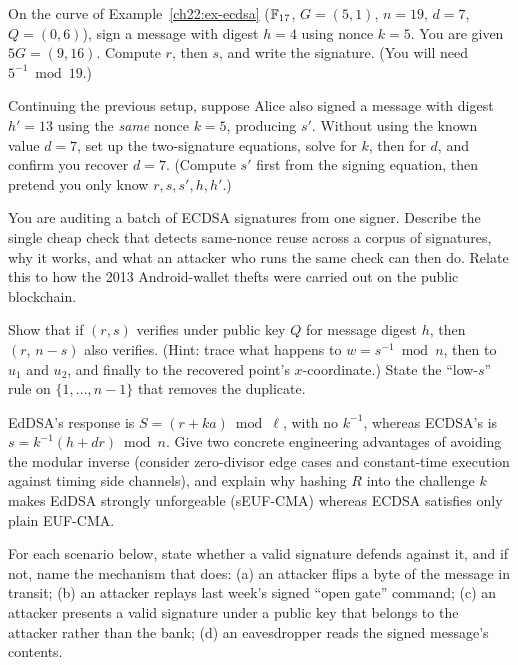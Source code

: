 \begin{exercise}
On the curve of Example~\ref{ch22:ex-ecdsa} ($\mathbb{F}_{17}$, $G=(5,1)$, $n=19$, $d=7$, $Q=(0,6)$), sign a message with digest $h = 4$ using nonce $k = 5$. You are given $5G = (9, 16)$. Compute $r$, then $s$, and write the signature. (You will need $5^{-1}\bmod 19$.)
\end{exercise}

\begin{exercise}
Continuing the previous setup, suppose Alice also signed a message with digest $h' = 13$ using the \emph{same} nonce $k = 5$, producing $s'$. Without using the known value $d=7$, set up the two-signature equations, solve for $k$, then for $d$, and confirm you recover $d = 7$. (Compute $s'$ first from the signing equation, then pretend you only know $r, s, s', h, h'$.)
\end{exercise}

\begin{exercise}
You are auditing a batch of ECDSA signatures from one signer. Describe the single cheap check that detects same-nonce reuse across a corpus of signatures, why it works, and what an attacker who runs the same check can then do. Relate this to how the 2013 Android-wallet thefts were carried out on the public blockchain.
\end{exercise}

\begin{exercise}
Show that if $(r, s)$ verifies under public key $Q$ for message digest $h$, then $(r,\, n - s)$ also verifies. (Hint: trace what happens to $w = s^{-1} \bmod n$, then to $u_1$ and $u_2$, and finally to the recovered point's $x$-coordinate.) State the ``low-$s$'' rule on $\{1, \dots, n-1\}$ that removes the duplicate.
\end{exercise}

\begin{exercise}
EdDSA's response is $S = (r + ka) \bmod \ell$, with no $k^{-1}$, whereas ECDSA's is $s = k^{-1}(h + dr)\bmod n$. Give two concrete engineering advantages of avoiding the modular inverse (consider zero-divisor edge cases and constant-time execution against timing side channels), and explain why hashing $R$ into the challenge $k$ makes EdDSA strongly unforgeable (sEUF-CMA) whereas ECDSA satisfies only plain EUF-CMA.
\end{exercise}

\begin{exercise}
For each scenario below, state whether a valid signature defends against it, and if not, name the mechanism that does: (a) an attacker flips a byte of the message in transit; (b) an attacker replays last week's signed ``open gate'' command; (c) an attacker presents a valid signature under a public key that belongs to the attacker rather than the bank; (d) an eavesdropper reads the signed message's contents.
\end{exercise}


